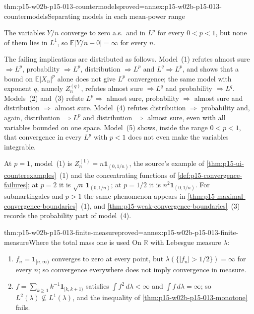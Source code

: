\begin{hbtheorem}{thm:p15-w02b-p15-013-countermodels}{proved=annex:p15-w02b-p15-013-countermodels}{Separating models in each mean-power range}
\begin{enumerate}
      The variables \(Y/n\) converge to zero a.s.\ and in \(L^p\) for
      every \(0<p<1\), but none of them lies in \(L^1\), so
      \(\mathbb E|Y/n-0|=\infty\) for every \(n\).
\end{enumerate}
The failing implications are distributed as follows. Model~(1)
refutes almost sure \(\Rightarrow L^p\), probability \(\Rightarrow L^p\),
distribution \(\Rightarrow L^p\) and \(L^q\Rightarrow L^p\), and shows that a
bound on \(\mathbb E|X_n|^p\) alone does not give \(L^p\) convergence;
the same model with exponent \(q\), namely \(Z^{(q)}_n\), refutes
almost sure \(\Rightarrow L^q\) and probability \(\Rightarrow L^q\).
Models~(2) and~(3) refute \(L^p\Rightarrow\) almost sure,
probability \(\Rightarrow\) almost sure and distribution \(\Rightarrow\) almost
sure. Model~(4) refutes distribution \(\Rightarrow\) probability and,
again, distribution \(\Rightarrow L^p\) and distribution \(\Rightarrow\) almost
sure, even with all variables bounded on one space. Model~(5) shows,
inside the range \(0<p<1\), that convergence in every \(L^p\) with
\(p<1\) does not even make the variables integrable.
\end{hbtheorem}

At \(p=1\), model~(1) is \(Z^{(1)}_n=n\mathbf1_{(0,1/n)}\), the source's
example of \cref{thm:p15-ui-counterexamples}~(1) and the concentrating
functions of \cref{def:p15-convergence-failures}; at \(p=2\) it is
\(\sqrt n\,\mathbf1_{(0,1/n)}\); at \(p=1/2\) it is
\(n^2\mathbf1_{(0,1/n)}\). For submartingales and \(p>1\) the same
phenomenon appears in \cref{thm:p15-maximal-convergence-boundaries}~(1),
and \cref{thm:p15-weak-convergence-boundaries}~(3) records the
probability part of model~(4).

\begin{hbtheorem}{thm:p15-w02b-p15-013-finite-measure}{proved=annex:p15-w02b-p15-013-finite-measure}{Where the total mass one is used}
On \(\mathbb R\) with Lebesgue measure \(\lambda\):
\begin{enumerate}
\item \(f_n=\mathbf1_{[n,\infty)}\) converges to zero at every point,
      but \(\lambda(\{|f_n|>1/2\})=\infty\) for every \(n\); so
      convergence everywhere does not imply convergence in measure.
\item \(f=\sum_{k\geq1}k^{-1}\mathbf1_{[k,k+1)}\) satisfies
      \(\int f^2\,d\lambda<\infty\) and \(\int f\,d\lambda=\infty\);
      so \(L^2(\lambda)\not\subseteq L^1(\lambda)\), and the
      inequality of \cref{thm:p15-w02b-p15-013-monotone} fails.
\end{enumerate}
\end{hbtheorem}

